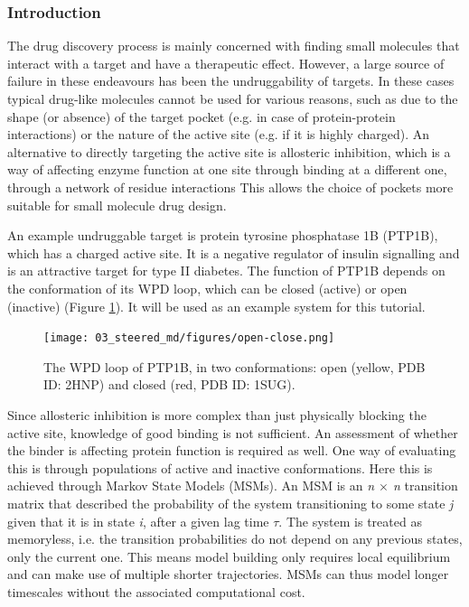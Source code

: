 \subsubsection{Introduction}
The drug discovery process is mainly concerned with finding small molecules that interact with a target and have a therapeutic effect. However, a large source of failure in these endeavours has been the undruggability of targets.\cite{sMD_druggability} In these cases typical drug-like molecules cannot be used for various reasons, such as due to the shape (or absence) of the target pocket (e.g. in case of protein-protein interactions)\cite{sMD_scott-ppi-2016} or the nature of the active site (e.g. if it is highly charged).\cite{sMD_ptp-rev-druggability} An alternative to directly targeting the active site is allosteric inhibition, which is a way of affecting enzyme function at one site through binding at a different one, through a network of residue interactions \cite{sMD_Motlagh-allostery,sMD_Verkhivker-allostery} This allows the choice of pockets more suitable for small molecule drug design.

An example undruggable target is protein tyrosine phosphatase 1B (PTP1B), which has a charged active site. It is a negative regulator of insulin signalling\cite{sMD_ptp1b-diabetes} and is an attractive target for type II diabetes.\cite{sMD_Wiesman} The function of PTP1B depends on the conformation of its WPD loop, which can be closed (active) or open (inactive) (Figure \ref{fig:ptp1b}). It will be used as an example system for this tutorial.

\begin{figure}[htp]
\texttt{[image: 03\_steered\_md/figures/open-close.png]}
\caption{The WPD loop of PTP1B, in two conformations: open (yellow, PDB ID: 2HNP) and closed (red, PDB ID: 1SUG).}
\label{fig:ptp1b}
\end{figure}

Since allosteric inhibition is more complex than just physically blocking the active site, knowledge of good binding is not sufficient. An assessment of whether the binder is affecting protein function is required as well. One way of evaluating this is through populations of active and inactive conformations. Here this is achieved through Markov State Models (MSMs). \cite{sMD_Prinz} An MSM is an \textit{n $\times$ n} transition matrix that described the probability of the system transitioning to some state \textit{j} given that it is in state \textit{i}, after a given lag time $\tau$. The system is treated as memoryless, i.e. the transition probabilities do not depend on any previous states, only the current one.\cite{sMD_Husic-msm} This means model building only requires local equilibrium and can make use of multiple shorter trajectories. MSMs can thus model longer timescales without the associated computational cost.\cite{sMD_Prinz}

